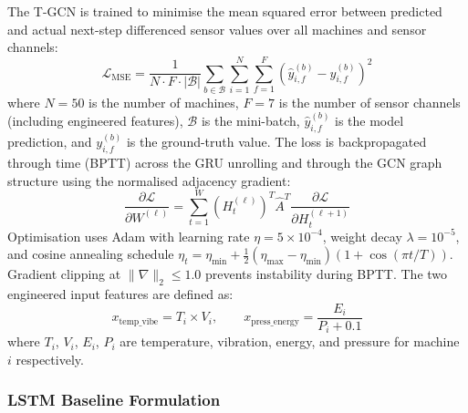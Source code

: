The T-GCN is trained to minimise the mean squared error between predicted and actual next-step differenced sensor values over all machines and sensor channels:
\begin{equation}
    \mathcal{L}_{\text{MSE}} = \frac{1}{N \cdot F \cdot |\mathcal{B}|} \sum_{b \in \mathcal{B}} \sum_{i=1}^{N} \sum_{f=1}^{F}
    \left(\hat{y}^{(b)}_{i,f} - y^{(b)}_{i,f}\right)^2
    \label{eq:tgcn_loss}
\end{equation}
where $N = 50$ is the number of machines, $F = 7$ is the number of sensor channels (including engineered features), $\mathcal{B}$ is the mini-batch, $\hat{y}^{(b)}_{i,f}$ is the model prediction, and $y^{(b)}_{i,f}$ is the ground-truth value. The loss is backpropagated through time (BPTT) across the GRU unrolling and through the GCN graph structure using the normalised adjacency gradient:
\begin{equation}
    \frac{\partial \mathcal{L}}{\partial W^{(\ell)}} = \sum_{t=1}^{W} \left(H^{(\ell)}_t\right)^T \hat{A}^T \frac{\partial \mathcal{L}}{\partial H^{(\ell+1)}_t}
    \label{eq:gcn_grad}
\end{equation}
Optimisation uses Adam with learning rate $\eta = 5 \times 10^{-4}$, weight decay $\lambda = 10^{-5}$, and cosine annealing schedule $\eta_t = \eta_{\min} + \frac{1}{2}(\eta_{\max} - \eta_{\min})(1 + \cos(\pi t / T))$. Gradient clipping at $\|\nabla\|_2 \leq 1.0$ prevents instability during BPTT. The two engineered input features are defined as:
\begin{equation}
    x_{\text{temp\_vibe}} = T_i \times V_i, \qquad
    x_{\text{press\_energy}} = \frac{E_i}{P_i + 0.1}
    \label{eq:eng_feat}
\end{equation}
where $T_i$, $V_i$, $E_i$, $P_i$ are temperature, vibration, energy, and pressure for machine $i$ respectively.

\subsubsection{LSTM Baseline Formulation}

